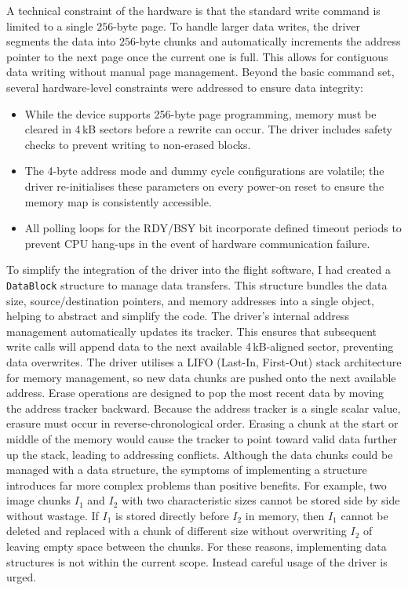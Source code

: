 A technical constraint of the hardware is that the standard write command is limited to a single $256$-byte page. To handle larger data writes, the driver segments the data into $256$-byte chunks and automatically increments the address pointer to the next page once the current one is full. This allows for contiguous data writing without manual page management.
\nl
Beyond the basic command set, several hardware-level constraints were addressed to ensure data integrity:
\begin{itemize}
    \item While the device supports 256-byte page programming, memory must be cleared in 4\,kB sectors before a rewrite can occur. The driver includes safety checks to prevent writing to non-erased blocks.
    \item The 4-byte address mode and dummy cycle configurations are volatile; the driver re-initialises these parameters on every power-on reset to ensure the memory map is consistently accessible.
    \item All polling loops for the RDY/BSY bit incorporate defined timeout periods to prevent CPU hang-ups in the event of hardware communication failure.
\end{itemize}

To simplify the integration of the driver into the flight software, I had created a \verb|DataBlock| structure to manage data transfers. This structure bundles the data size, source/destination pointers, and memory addresses into a single object, helping to abstract and simplify the code.
\nl
The driver's internal address management automatically updates its tracker. This ensures that subsequent write calls will append data to the next available 4\,kB-aligned sector, preventing data overwrites.
\nl
The driver utilises a LIFO (Last-In, First-Out) stack architecture for memory management, so new data chunks are pushed onto the next available address. Erase operations are designed to pop the most recent data by moving the address tracker backward. Because the address tracker is a single scalar value, erasure must occur in reverse-chronological order. Erasing a chunk at the start or middle of the memory would cause the tracker to point toward valid data further up the stack, leading to addressing conflicts.
\nl
Although the data chunks could be managed with a data structure, the symptoms of implementing a structure introduces far more complex problems than positive benefits. For example, two image chunks $I_1$ and $I_2$ with two characteristic sizes cannot be stored side by side without wastage. If $I_1$ is stored directly before $I_2$ in memory, then $I_1$ cannot be deleted and replaced with a chunk of different size without overwriting $I_2$ of leaving empty space between the chunks. For these reasons, implementing data structures is not within the current scope. Instead careful usage of the driver is urged.